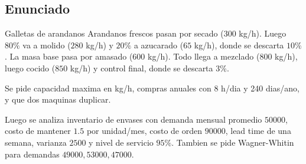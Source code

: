 \subsection{Enunciado}

\begin{enunciado}{Galletas de arandanos}
Arandanos frescos pasan por secado (\(300\) kg/h). Luego \(80\%\) va a molido (\(280\) kg/h) y \(20\%\) a azucarado (\(65\) kg/h), donde se descarta \(10\%\). La masa base pasa por amasado (\(600\) kg/h). Todo llega a mezclado (\(800\) kg/h), luego cocido (\(850\) kg/h) y control final, donde se descarta \(3\%\).

Se pide capacidad maxima en kg/h, compras anuales con 8 h/dia y 240 dias/ano, y que dos maquinas duplicar.

Luego se analiza inventario de envases con demanda mensual promedio \(50000\), costo de mantener \(1.5\) por unidad/mes, costo de orden \(90000\), lead time de una semana, varianza \(2500\) y nivel de servicio \(95\%\). Tambien se pide Wagner-Whitin para demandas \(49000,53000,47000\).
\end{enunciado}
